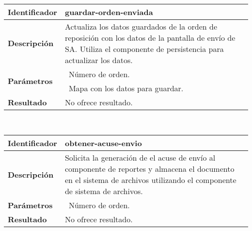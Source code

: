 	\vspace{5mm}\\
	\begin{tabular}{|p{}|p{}|}
		\hline
		\textbf{Identificador}	& \textbf{guardar-orden-enviada}\\
		\hline
		\hline
		\textbf{Descripción}	& Actualiza los datos guardados de la orden de reposición con los datos de la pantalla de envío de SA. Utiliza el componente de persistencia para actualizar los datos.\\
		\hline
		\multirow{2}{*}{\textbf{Parámetros}}	& \textbullet\, Número de orden.\\
												& \textbullet\, Mapa con los datos para guardar.\\
		\hline
		\textbf{Resultado}		& No ofrece resultado.\\
		\hline
	\end{tabular}
	\vspace{5mm}\\
	\begin{tabular}{|p{}|p{}|}
		\hline
		\textbf{Identificador}	& \textbf{obtener-acuse-envio}\\
		\hline
		\hline
		\textbf{Descripción}	& Solicita la generación de el acuse de envío al componente de reportes y almacena el documento en el sistema de archivos utilizando el componente de sistema de archivos.\\
		\hline
		\textbf{Parámetros}		& \textbullet\, Número de orden.\\
		\hline
		\textbf{Resultado}		& No ofrece resultado.\\
		\hline
	\end{tabular}
	\vspace{5mm}

